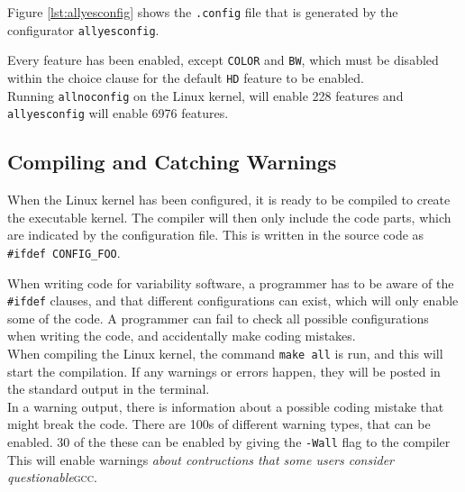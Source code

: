 \documentclass[a4paper,11pt]{report}
\newcommand{\textcode}[1]{\fboxsep=1pt\texttt{\colorbox{gray!20}{#1}}}
\newcommand{\figa}{
    \begin{figure}[!htpb]
    \centering
}
\newcommand{\figb}[2]{
    \caption{#1}
    \label{#2}
    \end{figure}
}
\begin{document}
\figa
    \subfigure[allnoconfig]{
        \label{lst:allnoconfig}
        
    }
    \qquad %
    \subfigure[allyesconfig]{
        \label{lst:allyesconfig}
        
    }
\figb{}{}


Figure \ref{lst:allyesconfig} shows the \texttt{.config} file that is generated by 
the configurator \texttt{allyesconfig}.

Every feature has been enabled, except \texttt{COLOR} and \texttt{BW}, which 
must be disabled within the choice clause for the default \texttt{HD} feature 
to be enabled.
\\

Running \texttt{allnoconfig} on the Linux kernel, will enable 228 features and 
\texttt{allyesconfig} will enable 6976 features.


            \subsection{Compiling and Catching Warnings}

When the Linux kernel has been configured, it is ready to be compiled to create 
the executable kernel. The compiler will then only include the code parts, 
which are indicated by the configuration file. This is written in the source 
code as \textcode{\#ifdef CONFIG\_FOO}.

When writing code for variability software, a programmer has to be aware of the 
\textcode{\#ifdef} clauses, and that different configurations can exist, which 
will only enable some of the code. A programmer can fail to check all possible 
configurations when writing the code, and accidentally make coding mistakes.
\\

When compiling the Linux kernel, the command \textcode{make all} is run, and 
this will start the compilation. If any warnings or errors happen, they will be 
posted in the standard output in the terminal.
\\

In a warning output, there is information about a possible coding mistake that 
might break the code. There are 100s of different warning types, that can be 
enabled. 30 of the these can be enabled by giving the \textcode{-Wall} flag 
to the compiler  This will enable warnings \emph{about contructions that some 
users consider questionable}\textsc{gcc}\cite{gccwarnings}.
\end{document}
